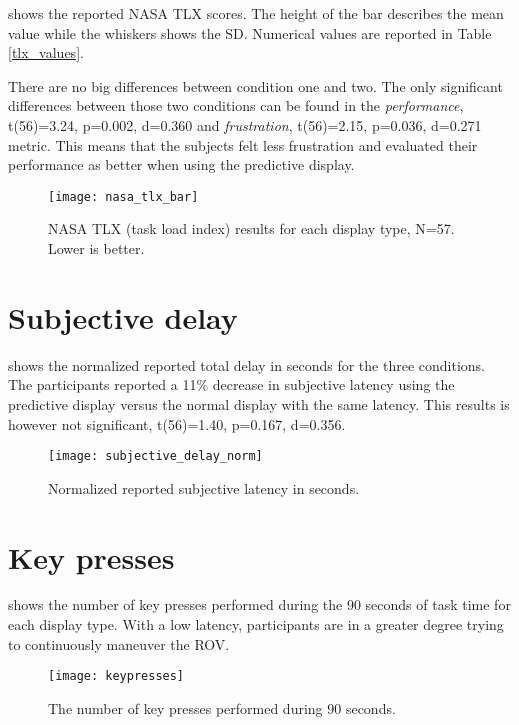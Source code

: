  shows the reported NASA TLX scores. The height of the bar describes the mean value while the whiskers shows the SD. Numerical values are reported in Table \ref{tlx_values}.

There are no big differences between condition one and two. The only significant differences between those two conditions can be found in the \emph{performance}, t(56)=3.24, p=0.002, d=0.360 and \emph{frustration}, t(56)=2.15, p=0.036, d=0.271 metric. This means that the subjects felt less frustration and evaluated their performance as better when using the predictive display.


\begin{figure}[h!]
    \centering
    \texttt{[image: nasa\_tlx\_bar]}
    \caption{NASA TLX (task load index) results for each display type, N=57. Lower is better.}
    \label{tlx}
\end{figure}


\clearpage
\section{Subjective delay}

 shows the normalized reported total delay in seconds for the three conditions. The participants reported a 11\% decrease in subjective latency using the predictive display versus the normal display with the same latency. This results is however not significant, t(56)=1.40, p=0.167, d=0.356.


\begin{figure}[h!]
    \centering
    \texttt{[image: subjective\_delay\_norm]}
    \caption{Normalized reported subjective latency in seconds.}
    \label{subjective_delay_norm}
\end{figure}

\section{Key presses}

 shows the number of key presses performed during the 90 seconds of task time for each display type. With a low latency, participants are in a greater degree trying to continuously maneuver the ROV.

\begin{figure}[h!]
    \centering
    \texttt{[image: keypresses]}
    \caption{The number of key presses performed during 90 seconds.}
    \label{keypresses}
\end{figure}

